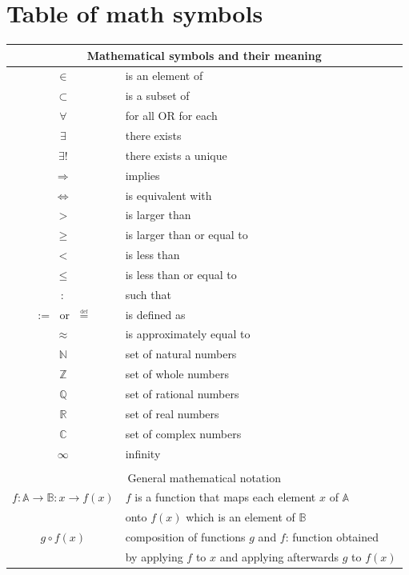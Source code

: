\chapter{Table of math symbols}

\begin{tabular}{ |c|l| }
  \hline
  \multicolumn{2}{|c|}{Mathematical symbols and their meaning} \\
  \hline
  $\in$ & is an element of \\
	$\subset$ & is a subset of \\
  $\forall$ & for all OR for each \\
	$\exists$ & there exists \\
	$\exists !$ & there exists a unique\\
	$ \Rightarrow $  & implies \\
	$ \Leftrightarrow $  & is equivalent with \\
	$ > $ & is larger than \\
	$ \geq $ & is larger than or equal to \\
	$ < $ & is less than \\
	$ \leq $ & is less than or equal to \\
	$ : $ & such that \\
	$ := \; $ or $\; \overset{\underset{\mathrm{def}}{}}{=}  $ & is defined as \\
	$ \approx $ & is approximately equal to \\
	$\mathbb{N}$ & set of natural numbers \\
	$\mathbb{Z}$ & set of whole numbers \\
	$\mathbb{Q}$ & set of rational numbers \\
	$\mathbb{R}$ & set of real numbers \\
	$\mathbb{C}$ & set of complex numbers \\
	$\infty$ & infinity \\
  \hline
\multicolumn{2}{c}{} \\
\hline
\multicolumn{2}{|c|}{General mathematical notation} \\
  \hline
	$f: \mathbb{A}\rightarrow \mathbb{B}: x \rightarrow f(x)$ & $f$ is a function that maps each element $x$ of $\mathbb{A}$\\
	 &  onto $f(x)$ which is an element of $\mathbb{B}$ \\
$g \circ f (x)$ & composition of functions $g$ and $f$: function obtained\\
& by applying $f$ to $x$ and applying afterwards $g$ to $f(x)$ \\
\hline
	\end{tabular}